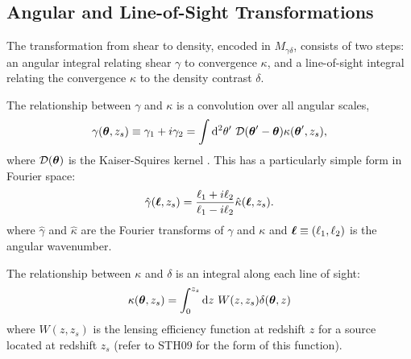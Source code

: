 \subsection{Angular and Line-of-Sight Transformations}
The transformation from shear to density, encoded in $M_{\gamma\delta}$,
consists of two steps: an angular integral relating shear $\gamma$ to
convergence $\kappa$, and a line-of-sight integral relating the convergence
$\kappa$ to the density contrast $\delta$.

The relationship between $\gamma$ and $\kappa$ is a convolution over
all angular scales,
\begin{equation}
  \label{gamma_integral}
  \gamma(\myvec\theta,z_s) \equiv \gamma_1 + i\gamma_2 = \int \dd^2\theta^\prime
  \ \mathcal{D}(\myvec\theta^\prime-\myvec\theta)\kappa(\myvec\theta^\prime,z_s),
\end{equation}
where $\mathcal{D}(\boldsymbol{\theta})$ 
is the Kaiser-Squires kernel \citep{Kaiser93}.  
This has a particularly simple form in Fourier space:
\begin{equation}
  \label{gamma_fourier}
  \hat\gamma(\boldsymbol{\ell},z_s) 
  = \frac{\ell_1 + i\ell_2}{\ell_1 - i\ell_2}\hat\kappa(\boldsymbol{\ell},z_s).
\end{equation}
where $\hat\gamma$ and $\hat\kappa$ are the Fourier transforms of $\gamma$
and $\kappa$ and $\boldsymbol{\ell}\equiv(\ell_1,\ell_2)$ is the angular wavenumber.

The relationship between $\kappa$ and $\delta$ is an integral along each
line of sight:
\begin{equation}
  \label{kappa_integral}
  \kappa(\boldsymbol{\theta},z_s) = 
  \int_0^{z_s}\mathrm{d} z\ W(z,z_s)\delta(\boldsymbol{\theta},z)
\end{equation}
where $W(z,z_s)$ is the lensing efficiency function at redshift $z$ 
for a source located at redshift $z_s$ 
(refer to STH09 for the form of this function).

